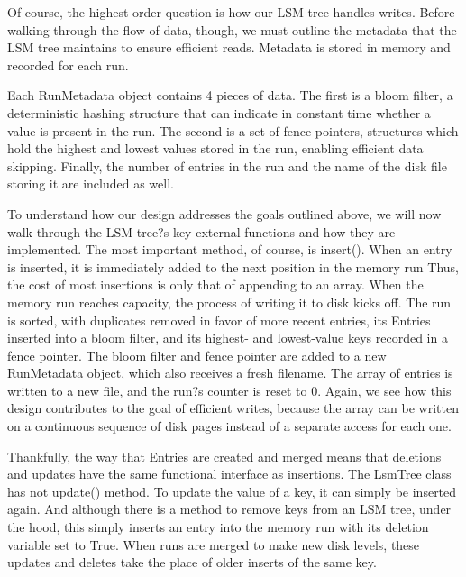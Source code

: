 \documentclass[12pt]{article}
\begin{document}
	Of course, the highest-order question is how our LSM tree handles writes. Before walking through the flow of data, though, we must outline the metadata that the LSM tree maintains to ensure efficient reads. Metadata is stored in memory and recorded for each run.
	
	Each RunMetadata object contains 4 pieces of data. The first is a bloom filter, a deterministic hashing structure that can indicate in constant time whether a value is present in the run. The second is a set of fence pointers, structures which hold the highest and lowest values stored in the run, enabling efficient data skipping. Finally, the number of entries in the run and the name of the disk file storing it are included as well.
	
	To understand how our design addresses the goals outlined above, we will now walk through the LSM tree?s key external functions and how they are implemented. The most important method, of course, is insert(). When an entry is inserted, it is immediately added to the next position in the memory run Thus, the cost of most insertions is only that of appending to an array. When the memory run reaches capacity, the process of writing it to disk kicks off. The run is sorted, with duplicates removed in favor of more recent entries, its Entries inserted into a bloom filter, and its highest- and lowest-value keys recorded in a fence pointer. The bloom filter and fence pointer are added to a new RunMetadata object, which also receives a fresh filename. The array of entries is written to a new file, and the run?s counter is reset to 0. Again, we see how this design contributes to the goal of efficient writes, because the array can be written on a continuous sequence of disk pages instead of a separate access for each one.
	
	Thankfully, the way that Entries are created and merged means that deletions and updates have the same functional interface as insertions. The LsmTree class has not update() method. To update the value of a key, it can simply be inserted again. And although there is a method to remove keys from an LSM tree, under the hood, this simply inserts an entry into the memory run with its deletion variable set to True. When runs are merged to make new disk levels, these updates and deletes take the place of older inserts of the same key.
	
\end{document}
